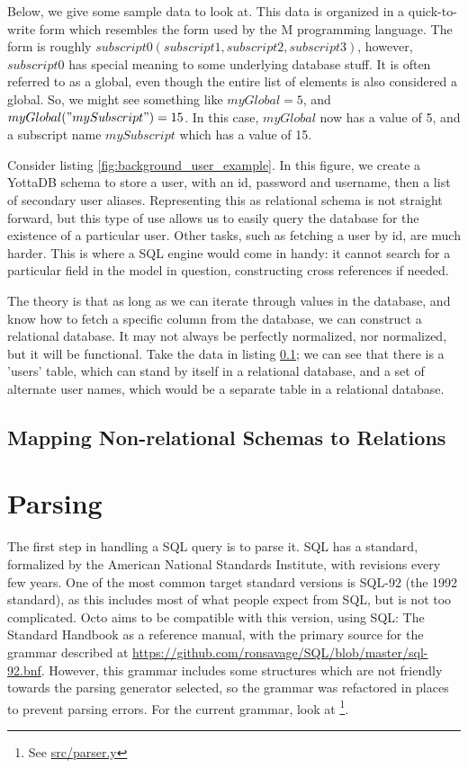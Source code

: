 \documentclass[]{article}
\newcommand{\gitlab}[1]{\footnote{See \href{https://gitlab.com/YottaDB/DBMS/YDBOcto/blob/master/#1}{#1}}}
\begin{document}
Below, we give some sample data to look at.
This data is organized in a quick-to-write form which resembles the form used by the M programming language.
The form is roughly $subscript0(subscript1,subscript2,subscript3)$, however, $subscript0$ has special meaning to some underlying database stuff.
It is often referred to as a global, even though the entire list of elements is also considered a global.
So, we might see something like $myGlobal=5$, and $myGlobal("mySubscript")=15$.
In this case, $myGlobal$ now has a value of 5, and a subscript name $mySubscript$ which has a value of 15.

Consider listing \ref{fig:background_user_example}.
In this figure, we create a YottaDB schema to store a user, with an id, password and username, then a list of secondary user aliases.
Representing this as relational schema is not straight forward, but this type of use allows us to easily query the database for the existence of a particular user.
Other tasks, such as fetching a user by id, are much harder.
This is where a SQL engine would come in handy: it cannot search for a particular field in the model in question, constructing cross references if needed.



The theory is that as long as we can iterate through values in the database, and know how to fetch a specific column from the database, we can construct a relational database.
It may not always be perfectly normalized, nor normalized, but it will be functional.
Take the data in listing \ref{sec:background_mapping}; we can see that there is a 'users' table, which can stand by itself in a relational database, and a set of alternate user names, which would be a separate table in a relational database.

\subsection{Mapping Non-relational Schemas to Relations} \label{sec:background_mapping}

\section{Parsing} \label{sec:parsing}

The first step in handling a SQL query is to parse it.
SQL has a standard, formalized by the American National Standards Institute, with revisions every few years.
One of the most common target standard versions is SQL-92 (the 1992 standard), as this includes most of what people expect from SQL, but is not too complicated.
Octo aims to be compatible with this version, using SQL: The Standard Handbook \cite{cannan1993sql} as a reference manual, with the primary source for the grammar described at \url{https://github.com/ronsavage/SQL/blob/master/sql-92.bnf}\cite{ronsavage2003sql}.
However, this grammar includes some structures which are not friendly towards the parsing generator selected, so the grammar was refactored in places to prevent parsing errors.
For the current grammar, look at \gitlab{src/parser.y}.
\end{document}
